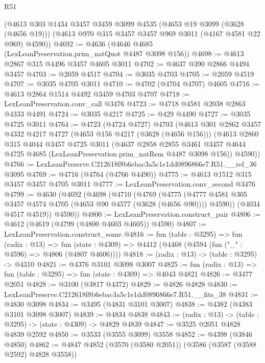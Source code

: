 \begin{lexlean}{R51}
\begin{coremodule}
    (@4613
      @303
      @1434
      @3457
      @3459
      @3099
      @4535
      (@4653 @19 @3099 (@3628 (@4656 @19)))
      (@4613 @970 @315 @3457 @3457 @969 @3011 (@4167 @4581 @22 @969) @4590))
@4692 := @4636 (@4646 @4685 (LexLeanPreservation.prim_natQuot @4487 @3098 @156))
@4698 := @4613 @2867 @315 @4496 @3457 @4605 @3011
@4702 := @4637 @390 @2866 @4494 @3457
@4703 := @2059 @4517
@4704 := @3035 @4703
@4705 := @2059 @4519
@4707 := @3035 @4705 @3011
@4710 := @4702 (@4704 @4707) @4605
@4716 := @4613 @2864 @1514 @4492 @3459 @4703 @4707
@4718 := LexLeanPreservation.conv_call @3476
@4723 := @4718 @4581 @2038 @2863 @4333 @4491
@4724 := @3035 @4217
@4725 := @429 @4490
@4727 := @3035 @4725 @3011
@4764 := @4723
    (@4724 @4727)
    @4703
    (@4613
      @301
      @2862
      @3457
      @4332
      @4217
      @4727
      (@4653 @156 @4217 (@3628 (@4656 @156)))
      (@4613
        @2860
        @315
        @4044
        @3457
        @4725
        @3011
        (@4637
          @2858
          @2855
          @3461
          @3457
          @4644
          @4725
          @4685
          (LexLeanPreservation.prim_natRem @4487 @3098 @156))
        @4590))
@4766 := LexLeanPreserve.C212618f8b6ebac3a5c1e1dd0896866e7.R51.__rel_36 @3095
@4769 := @4716 (@4764 (@4766 @4490))
@4775 := @4613 @1512 @315 @3457 @3457 @4705 @3011
@4777 := LexLeanPreservation.conv_second @3476
@4799 := @4630
    (@4692
      (@4698
        (@4710
          (@4769
            (@4775
              (@4777 @4581 @305 @3457 @4574 @4705 (@4653 @90 @4577 (@3628 (@4656 @90))))
              @4590))
          (@4034 @4517 @4519))
        @4590))
@4800 := LexLeanPreservation.construct_pair
@4806 := @4612 (@4619 (@4799 (@4800 @4603 @4605)) @4590)
@4807 := LexLeanPreservation.construct_some
@4816 := fun (table : @3295) =>
  fun (radix : @13) =>
  fun (state : @4309) => @4412 (@4468 (@4594 (fun ("_" : @4596) => @4806 (@4807 @4606))))
@4818 := (radix : @13) -> (table : @3295) -> @4310
@4821 := @4376 @3101 @3098 @3007
@4825 := fun (radix : @13) => fun (table : @3295) => fun (state : @4309) => @4043 @4821
@4826 := @3477 @2051
@4828 := @3100 (@3817 @4372)
@4829 := @4826 @4828
@4830 := LexLeanPreserve.C212618f8b6ebac3a5c1e1dd0896866e7.R51.__fits_38
@4831 := @4830 @3098
@4834 := @3495 (@4831 @3101 @3007)
@4838 := @4382 (@4383 @3101 @3098 @3007)
@4839 := @4834 @4838
@4843 := (radix : @13) -> (table : @3295) -> (state : @4309) -> @4829 @4839
@4847 := @3525 @2051 @4828 @4839 @2592
@4850 := @3533 (@3555 @3099) @3558
@4852 := @4398 (@3846 @4850)
@4862 := @4847 @4852 (@3570 (@3580 @2051)) (@3586 (@3587 (@3588 @2592) @4828 @3558))

\end{coremodule}
\end{lexlean}
